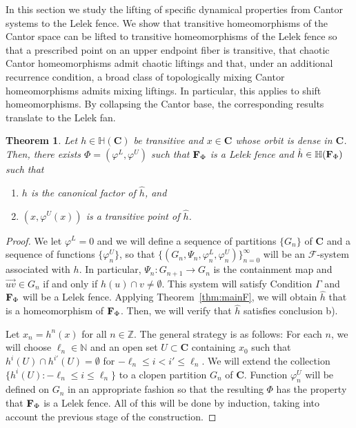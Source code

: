 \documentclass[11pt]{amsart}
\newtheorem{theorem}{Theorem}[section]
\newcommand{\N}{\mathbb{N}}  %
\newcommand{\Z}{\mathbb{Z}}  %
\newcommand{\oa}{\overrightarrow}
\newcommand{\cantor}{\mathbf C}
\newcommand{\fence}{{\bf F}_{\Phi}{}}
\newcommand{\groupcantor}{{\mathbb H}(\cantor)}
\newcommand{\groupfence}{{\mathbb{H}(\fence)}}
\newcommand{\cF}{\mathcal{F}}
\newcommand{\fsystem}{\{(G_n, \Psi_n,\varphi^L_n,\varphi^U_n)\}_{n=0}^{\infty}}
\begin{document}
{In this section we study the lifting of specific dynamical properties from Cantor systems to the Lelek fence. We show that transitive homeomorphisms of the Cantor space can be lifted to transitive homeomorphisms of the Lelek fence so that a prescribed point on an upper endpoint fiber is transitive, that chaotic Cantor homeomorphisms admit chaotic liftings and that, under an additional recurrence condition, a broad class of topologically mixing Cantor homeomorphisms admits mixing liftings. In particular, this applies to shift homeomorphisms. By collapsing the Cantor base, the corresponding results translate to the Lelek fan.

\begin{theorem}\label{thm:transitive}
    Let $h \in \groupcantor$ be transitive and  $x \in \cantor$ whose orbit is dense in $\cantor$. Then, there exists $\Phi = (\varphi^L, \varphi^U)$ such that $\fence$ is a Lelek fence and $\hat{h} \in \groupfence$ such that 
    \begin{enumerate}
        \item[a)] $h$ is the canonical factor of $\hat{h}$, and
        \item [b)] $(x, \varphi^U(x))$ is a transitive point of $\hat{h}$.
    \end{enumerate}
\end{theorem}
\begin{proof}
We let $\varphi^L=0$ and 
    we will define a sequence of partitions $\{G_n\}$  of $\cantor$ and a sequence of functions $\{\varphi^U_n\}$, so that $\fsystem$ will be an  $\cF$-system associated with $h$. In particular, $
    \Psi_n:G_{n+1} \rightarrow G_n$ is the  containment map and $ \oa{uv} \in G_n$ if and only if $h(u) \cap v \neq \emptyset$.  This system will satisfy Condition $\Gamma$ and $\fence$ will be a Lelek fence. Applying Theorem~\ref{thm:mainF}, we will obtain $\hat h$ that is a homeomorphism of $\fence$. Then, we will verify that $\hat{h}$ satisfies conclusion b).

 Let $x_n = h^n(x)$ for all $n \in \Z$. The general strategy is as follows: For each $n$, we will choose $\ell_n \in \N$ and an open set $U\subset \cantor$ containing $x_{0}$ such that $h^i(U) \cap h^{i'}(U) = \emptyset$ for $ -\ell_n  \le i< i' \le \ell_n$. We will extend the collection $\{h^i(U): -\ell_n \le i \le \ell_n\}$ to a clopen partition $G_n$ of $ \cantor$. Function $\varphi^U_n$ will be defined on $G_n$ in an appropriate fashion so that the resulting $\Phi$ has the property that $\fence$ is a Lelek fence. All of this will be done by induction, taking into account the previous stage of the construction.  


\end{proof}}
\end{document}
